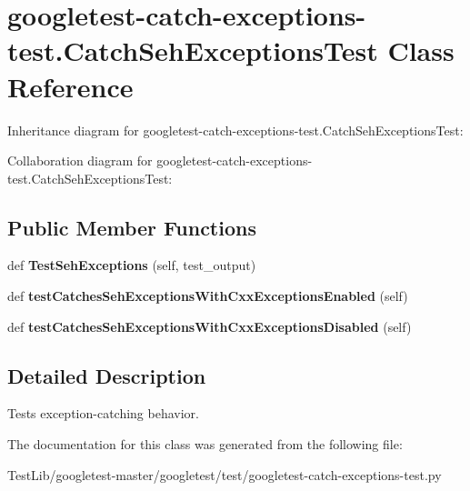 \hypertarget{classgoogletest-catch-exceptions-test_1_1CatchSehExceptionsTest}{}\section{googletest-\/catch-\/exceptions-\/test.Catch\+Seh\+Exceptions\+Test Class Reference}
\label{classgoogletest-catch-exceptions-test_1_1CatchSehExceptionsTest}


Inheritance diagram for googletest-\/catch-\/exceptions-\/test.Catch\+Seh\+Exceptions\+Test\+:


Collaboration diagram for googletest-\/catch-\/exceptions-\/test.Catch\+Seh\+Exceptions\+Test\+:
\subsection*{Public Member Functions}
\begin{DoxyCompactItemize}
\item 
\mbox{\label{classgoogletest-catch-exceptions-test_1_1CatchSehExceptionsTest_a86d5639a464b9ee5e05816758bd1ae1f}} 
def {\bfseries Test\+Seh\+Exceptions} (self, test\+\_\+output)
\item 
\mbox{\label{classgoogletest-catch-exceptions-test_1_1CatchSehExceptionsTest_abfb6b8448b7af79621f6f663e40ebca3}} 
def {\bfseries test\+Catches\+Seh\+Exceptions\+With\+Cxx\+Exceptions\+Enabled} (self)
\item 
\mbox{\label{classgoogletest-catch-exceptions-test_1_1CatchSehExceptionsTest_a8e448244058ea16b0ba3148678c0b9e6}} 
def {\bfseries test\+Catches\+Seh\+Exceptions\+With\+Cxx\+Exceptions\+Disabled} (self)
\end{DoxyCompactItemize}


\subsection{Detailed Description}
\begin{DoxyVerb}Tests exception-catching behavior.\end{DoxyVerb}
 

The documentation for this class was generated from the following file\+:\begin{DoxyCompactItemize}
\item 
Test\+Lib/googletest-\/master/googletest/test/googletest-\/catch-\/exceptions-\/test.\+py\end{DoxyCompactItemize}
